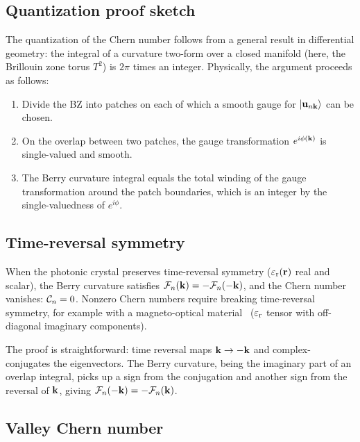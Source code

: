 \subsection{Quantization proof sketch}
\label{ssec:chern-proof}

The quantization of the Chern number follows from a general result in
differential geometry: the integral of a curvature two-form over a
closed manifold (here, the Brillouin zone torus $T^2$) is $2\pi$ times
an integer. Physically, the argument proceeds as follows:
\begin{enumerate}
 \item Divide the BZ into patches on each of which a smooth gauge for
 $|\mathbf{u}_{n\mathbf{k}}\rangle$ can be chosen.
 \item On the overlap between two patches, the gauge transformation
 $e^{i\phi(\mathbf{k})}$ is single-valued and smooth.
 \item The Berry curvature integral equals the total winding of the
 gauge transformation around the patch boundaries, which is an
 integer by the single-valuedness of $e^{i\phi}$.
\end{enumerate}

\subsection{Time-reversal symmetry}
\label{ssec:time-reversal-berry}

When the photonic crystal preserves time-reversal symmetry
($\varepsilon_{\mathrm{r}}(\mathbf{r})$ real and scalar), the Berry curvature satisfies
$\mathcal{F}_n(\mathbf{k}) = -\mathcal{F}_n(-\mathbf{k})$, and the Chern number vanishes:
$\mathcal{C}_n = 0$. Nonzero Chern numbers require breaking time-reversal
symmetry, for example with a magneto-optical material~\cite{he2016photonic,chen2023berry,yang2018realization,khanikaev2016three,horiuchi2013photonic,slobozhanyuk2015observation,gao2016probing}
($\varepsilon_{\mathrm{r}}$ tensor with off-diagonal imaginary components).

The proof is straightforward: time reversal maps $\mathbf{k} \to -\mathbf{k}$ and
complex-conjugates the eigenvectors. The Berry curvature, being the
imaginary part of an overlap integral, picks up a sign from the
conjugation and another sign from the reversal of $\mathbf{k}$, giving
$\mathcal{F}_n(-\mathbf{k}) = -\mathcal{F}_n(\mathbf{k})$.

\subsection{Valley Chern number}
\label{ssec:valley-chern}

